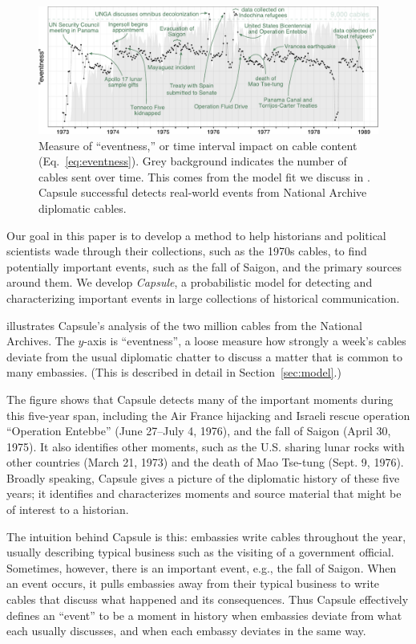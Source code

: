 \begin{figure}[ht]
\centering
\includegraphics[width=\linewidth]{fig/cables_events.pdf}
\caption{Measure of ``eventness,'' or time interval impact on cable content (Eq.~\ref{eq:eventness}).  Grey background indicates the number of cables sent over time.  This comes from the model fit we discuss in .  Capsule successful detects real-world events from National Archive diplomatic cables.}
\label{fig:cables_events}
\end{figure}

Our goal in this paper is to develop a method to help historians and
political scientists wade through their collections, such as the 1970s
cables, to find potentially important events, such as the fall of
Saigon, and the primary sources around them. We develop
\textit{Capsule}, a probabilistic model for detecting and
characterizing important events in large collections of historical
communication.

 illustrates Capsule's analysis of the two
million cables from the National Archives. The \mbox{$y$-axis} is
``eventness'', a loose measure how strongly a week's cables deviate
from the usual diplomatic chatter to discuss a matter that is common
to many embassies. (This is described in detail in Section~\ref{sec:model}.)

The figure shows that Capsule detects many of the important moments
during this five-year span, including the Air France hijacking and Israeli rescue operation ``Operation Entebbe''
(June 27--July 4, 1976), and the fall of Saigon (April 30, 1975). It also identifies other moments,
such as the U.S. sharing lunar rocks with other countries (March 21, 1973) and
the death of Mao Tse-tung (Sept. 9, 1976). Broadly speaking, Capsule gives a
picture of the diplomatic history of these five years; it identifies
and characterizes moments and source material that might be of
interest to a historian.

The intuition behind Capsule is this: embassies write cables
throughout the year, usually describing typical business such as the
visiting of a government official. Sometimes, however, there is an
important event, e.g., the fall of Saigon. When an event occurs, it
pulls embassies away from their typical business to write cables that
discuss what happened and its consequences. Thus Capsule effectively
defines an ``event'' to be a moment in history when embassies deviate
from what each usually discusses, and when each embassy deviates in
the same way.

